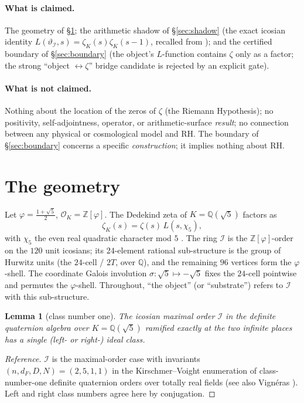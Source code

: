 \documentclass[11pt]{article}
\newtheorem{lemma}[theorem]{Lemma}
\theoremstyle{definition}
\newcommand{\Z}{\mathbb{Z}}
\newcommand{\Q}{\mathbb{Q}}
\newcommand{\zetaK}{\zeta_{K}}
\newcommand{\Icos}{\mathcal{I}}
\renewcommand{\Theta}{\vartheta}
\begin{document}
\paragraph{What is claimed.} The geometry of \S\ref{sec:geometry}; the arithmetic shadow
of \S\ref{sec:shadow} (the exact icosian identity $L(\Theta_\Icos,s)=\zetaK(s)\zetaK(s-1)$,
recalled from \cite{IcosianTriad}); and the certified boundary of \S\ref{sec:boundary}
(the object's $L$-function contains $\zeta$ only as a factor; the strong
``object $\leftrightarrow\zeta$'' bridge candidate is rejected by an explicit gate).

\paragraph{What is not claimed.} Nothing about the location of the zeros of $\zeta$ (the
Riemann Hypothesis); no positivity, self-adjointness, operator, or arithmetic-surface
\emph{result}; no connection between any physical or cosmological model and RH. The
boundary of \S\ref{sec:boundary} concerns a specific \emph{construction}; it implies
nothing about RH.

\section{The geometry}\label{sec:geometry}
Let $\varphi=\tfrac{1+\sqrt5}{2}$, $\mathcal{O}_K=\Z[\varphi]$. The Dedekind zeta of
$K=\Q(\sqrt5)$ factors as
\begin{equation}\label{eq:dedekind}
  \zetaK(s)=\zeta(s)\,L(s,\chi_5),
\end{equation}
with $\chi_5$ the even real quadratic character mod $5$ \cite{Neukirch}. The ring
$\Icos$ is the $\Z[\varphi]$-order on the $120$ unit icosians; its $24$-element rational
sub-structure is the group of Hurwitz units (the $24$-cell / $2T$, over $\Q$), and the
remaining $96$ vertices form the $\varphi$-shell. The coordinate Galois involution
$\sigma:\sqrt5\mapsto-\sqrt5$ fixes the $24$-cell pointwise and permutes the
$\varphi$-shell. Throughout, ``the object'' (or ``substrate'') refers to $\Icos$ with
this sub-structure.

\begin{lemma}[class number one]\label{lem:h1}
The icosian maximal order $\Icos$ in the definite quaternion algebra over $K=\Q(\sqrt5)$
ramified exactly at the two infinite places has a single (left- or right-) ideal class.
\end{lemma}
\begin{proof}[Reference]
$\Icos$ is the maximal-order case with invariants $(n,d_F,D,N)=(2,5,1,1)$ in the
Kirschmer--Voight enumeration of class-number-one definite quaternion orders over
totally real fields \cite[Table 8.2]{KirschmerVoight} (see also Vign\'eras
\cite{Vigneras}). Left and right class numbers agree here by conjugation.
\end{proof}
\end{document}

